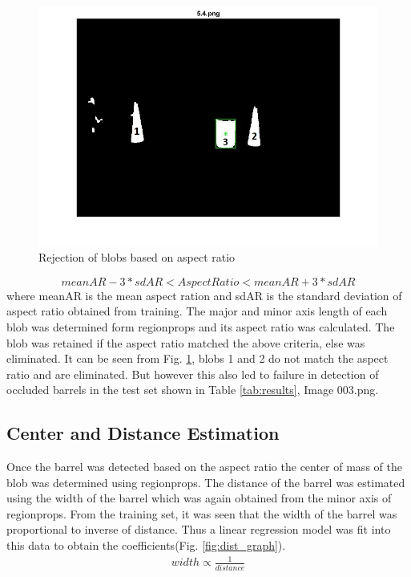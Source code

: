 \documentclass[fleqn,10pt]{SelfArx} %
\begin{document}
\begin{figure}[h]
\centering
\includegraphics[trim={2cm 2cm 3cm 2cm},clip,scale=0.4]{ar.jpg}
\caption{Rejection of blobs based on aspect ratio}
\label{fig:ar}
\end{figure}

\[ meanAR-3*sdAR < AspectRatio < meanAR+3*sdAR
\]
where meanAR is the mean aspect ration and sdAR is the standard deviation of aspect ratio obtained from training.
The major and minor axis length of each blob was determined form regionprops and its aspect ratio was calculated. The blob was retained if the aspect ratio matched the above criteria, else was eliminated. It can be seen from Fig. \ref{fig:ar}, blobs 1 and 2 do not match the aspect ratio and are eliminated. But however this also led to failure in detection of occluded barrels in the test set shown in Table \ref{tab:results}, Image 003.png.


\subsection{Center and Distance Estimation}
Once the barrel was detected based on the aspect ratio the center of mass of the blob was determined using regionprops. The distance of the barrel was estimated using the width of the barrel which was again obtained from the minor axis of regionprops. From the training set, it was seen that the width of the barrel was proportional to inverse of distance. Thus a linear regression model was fit into this data to obtain the coefficients(Fig. \ref{fig:dist_graph}).
\begin{align*}
width \propto \frac{1}{distance}
\end{align*}
\end{document}
